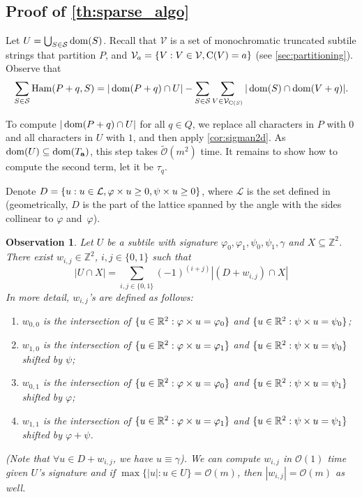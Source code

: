 \documentclass[11pt, letterpaper]{article}
\theoremstyle{plain}
\newtheorem{observation}{Observation}
\theoremstyle{definition}
\theoremstyle{remark}
\newcommand{\R}{\mathbb{R}}
\newcommand{\Z}{\mathbb{Z}}
\renewcommand{\O}{\mathcal{O}}
\newcommand{\tO}{\tilde{\mathcal{O}}}
\renewcommand{\S}{\mathcal{S}}
\newcommand{\V}{\mathcal{V}}
\renewcommand{\L}{\mathcal{L}}
\renewcommand{\phi}{\varphi}
\newcommand{\set}[1]{\left\lbrace #1 \right\rbrace}
\DeclareMathOperator*{\Ham}{Ham}
\begin{document}
\subsection{Proof of \cref{th:sparse_algo}}
\SparseAlgo
Let $U = \bigcup_{S \in \S} \d{S}$. Recall that $\V$ is a set of monochromatic truncated subtile strings that partition $P$, and $\V_a = \set{V : V \in \V, \getchar{V} = a}$ (see \ref{sec:partitioning}).
 Observe that
\begin{align}
\label{eq:sparse}
\sum_{S \in \S} \Ham(P + q, S) = |\d{P + q} \cap U| - \sum_{S \in \S}\sum_{V \in \V_{\getchar{S}}} |\d{S} \cap \d{V + q}|.
\end{align}

To compute $|\operatorname*{dom}(P + q) \cap U|$ for all $q \in Q$, we replace all characters in $P$ with $0$ and all characters in $U$ with $1$, and then apply \cref{cor:sigman2d}. As $\operatorname*{dom}(U) \subseteq \operatorname*{dom}(T_\mathbf{a})$, this step takes $\tO(m^2)$ time. It remains to show how to compute the second term, let it be $\tau_q$. 

Denote $D = \set{u : u \in \L, \h{u} \ge 0, \s{u} \ge 0}$, where $\L$ is the set defined in  (geometrically, $D$ is the part of the lattice spanned by the angle with the sides collinear to $\phi$ and~$\varphi$).

\begin{observation}\label{primitive}
Let $U$ be a subtile with signature $\phi_0, \phi_1, \psi_0, \psi_1, \gamma$ and $X \subseteq \Z^2$. There exist $w_{i,j} \in \Z^2$, $i,j \in \{0,1\}$ such that
\[ |U \cap X| = \sum_{i,j \in \{0,1\}} (-1)^{(i+j)} |(D + w_{i,j}) \cap X|\]
In more detail, $w_{i,j}$'s are defined as follows: 
\begin{enumerate}
\item $w_{0,0}$ is the intersection of $\{u \in \R^2 : \h{u} = \phi_0\}$ and $\{u \in \R^2 : \s{u} = \psi_0\}$;
\item $w_{1,0}$ is the intersection of $\{u \in \R^2 : \h{u} = \phi_1\}$ and $\{u \in \R^2 : \s{u} = \psi_0\}$ shifted by $\psi$;
\item $w_{0,1}$ is the intersection of $\{u \in \R^2 : \h{u} = \phi_0\}$ and $\{u \in \R^2 : \s{u} = \psi_1\}$ shifted by $\phi$;
\item $w_{1,1}$ is the intersection of $\{u \in \R^2 : \h{u} = \phi_1\}$ and $\{u \in \R^2 : \s{u} = \psi_1\}$ shifted by $\phi+\psi$.
\end{enumerate}
(Note that $\forall u \in D + w_{i,j}$, we have $u \equiv \gamma$). We can compute $w_{i,j}$ in $\O(1)$ time given $U$'s signature and if $\max \{|u| : u \in U\} = \O(m)$, then $|w_{i,j}| = \O(m)$ as well. 
\end{observation}
\end{document}
